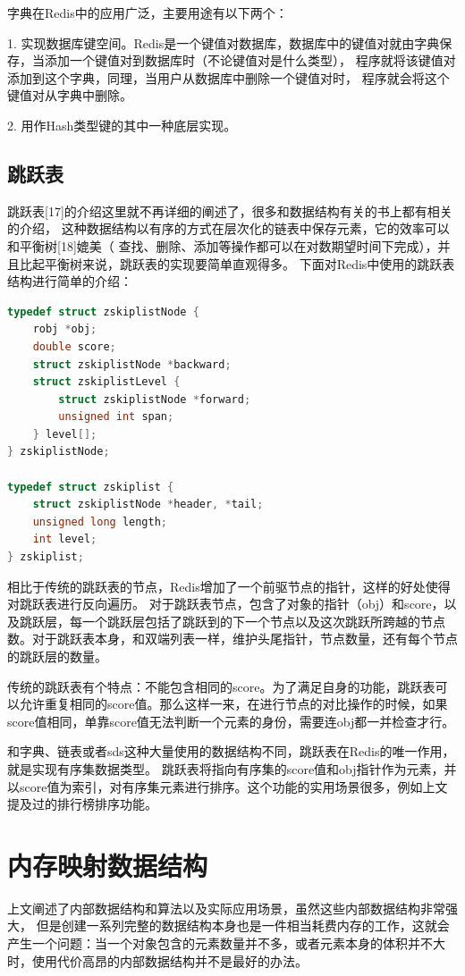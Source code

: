 \documentclass{zjutthesis}
\begin{document}
字典在Redis中的应用广泛，主要用途有以下两个：

1. 实现数据库键空间。Redis是一个键值对数据库，数据库中的键值对就由字典保存，当添加一个键值对到数据库时（不论键值对是什么类型）， 程序就将该键值对添加到这个字典，同理，当用户从数据库中删除一个键值对时， 程序就会将这个键值对从字典中删除。

2. 用作Hash类型键的其中一种底层实现。

\subsection{跳跃表}
跳跃表[17]的介绍这里就不再详细的阐述了，很多和数据结构有关的书上都有相关的介绍， 这种数据结构以有序的方式在层次化的链表中保存元素，它的效率可以和平衡树[18]媲美（ 查找、删除、添加等操作都可以在对数期望时间下完成），并且比起平衡树来说，跳跃表的实现要简单直观得多。
下面对Redis中使用的跳跃表结构进行简单的介绍：
\begin{lstlisting}[language=C]
typedef struct zskiplistNode {
    robj *obj;
    double score;
    struct zskiplistNode *backward;
    struct zskiplistLevel {
        struct zskiplistNode *forward;
        unsigned int span;
    } level[];
} zskiplistNode;

typedef struct zskiplist {
    struct zskiplistNode *header, *tail;
    unsigned long length;
    int level;
} zskiplist;
\end{lstlisting}
相比于传统的跳跃表的节点，Redis增加了一个前驱节点的指针，这样的好处使得对跳跃表进行反向遍历。
对于跳跃表节点，包含了对象的指针（obj）和score，以及跳跃层，每一个跳跃层包括了跳跃到的下一个节点以及这次跳跃所跨越的节点数。对于跳跃表本身，和双端列表一样，维护头尾指针，节点数量，还有每个节点的跳跃层的数量。

传统的跳跃表有个特点：不能包含相同的score。为了满足自身的功能，跳跃表可以允许重复相同的score值。那么这样一来，在进行节点的对比操作的时候，如果score值相同，单靠score值无法判断一个元素的身份，需要连obj都一并检查才行。

和字典、链表或者sds这种大量使用的数据结构不同，跳跃表在Redis的唯一作用，就是实现有序集数据类型。
跳跃表将指向有序集的score值和obj指针作为元素，并以score值为索引，对有序集元素进行排序。这个功能的实用场景很多，例如上文提及过的排行榜排序功能。


\section{内存映射数据结构}
上文阐述了内部数据结构和算法以及实际应用场景，虽然这些内部数据结构非常强大， 但是创建一系列完整的数据结构本身也是一件相当耗费内存的工作，这就会产生一个问题：当一个对象包含的元素数量并不多，或者元素本身的体积并不大时，使用代价高昂的内部数据结构并不是最好的办法。
\end{document}
